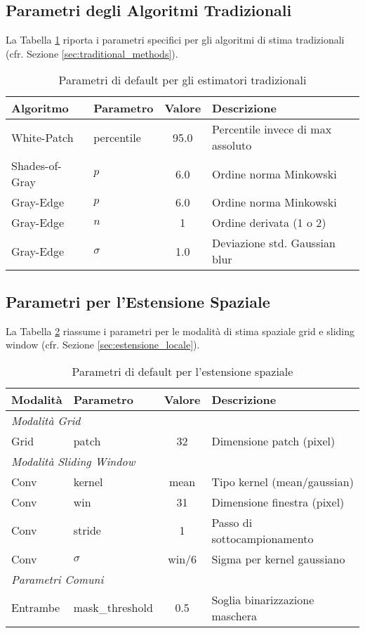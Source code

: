 \subsection{Parametri degli Algoritmi Tradizionali}

La Tabella \ref{tab:traditional_params} riporta i parametri specifici per gli algoritmi di stima tradizionali (cfr. Sezione \ref{sec:traditional_methods}).

\begin{table}[htbp]
\centering
\caption{Parametri di default per gli estimatori tradizionali}
\label{tab:traditional_params}
\begin{tabular}{llcp{5.5cm}}
\toprule
\textbf{Algoritmo} & \textbf{Parametro} & \textbf{Valore} & \textbf{Descrizione} \\
\midrule
White-Patch & percentile & 95.0 & Percentile invece di max assoluto \\
Shades-of-Gray & $p$ & 6.0 & Ordine norma Minkowski \\
Gray-Edge & $p$ & 6.0 & Ordine norma Minkowski \\
Gray-Edge & $n$ & 1 & Ordine derivata (1 o 2) \\
Gray-Edge & $\sigma$ & 1.0 & Deviazione std. Gaussian blur \\
\bottomrule
\end{tabular}
\end{table}

\subsection{Parametri per l'Estensione Spaziale}

La Tabella \ref{tab:spatial_params} riassume i parametri per le modalità di stima spaziale grid e sliding window (cfr. Sezione \ref{sec:estensione_locale}).

\begin{table}[htbp]
\centering
\caption{Parametri di default per l'estensione spaziale}
\label{tab:spatial_params}
\begin{tabular}{llcp{5.5cm}}
\toprule
\textbf{Modalità} & \textbf{Parametro} & \textbf{Valore} & \textbf{Descrizione} \\
\midrule
\multicolumn{4}{l}{\textit{Modalità Grid}} \\
\midrule
Grid & patch & 32 & Dimensione patch (pixel) \\
\midrule
\multicolumn{4}{l}{\textit{Modalità Sliding Window}} \\
\midrule
Conv & kernel & mean & Tipo kernel (mean/gaussian) \\
Conv & win & 31 & Dimensione finestra (pixel) \\
Conv & stride & 1 & Passo di sottocampionamento \\
Conv & $\sigma$ & win/6 & Sigma per kernel gaussiano \\
\midrule
\multicolumn{4}{l}{\textit{Parametri Comuni}} \\
\midrule
Entrambe & mask\_threshold & 0.5 & Soglia binarizzazione maschera \\
\bottomrule
\end{tabular}
\end{table}

